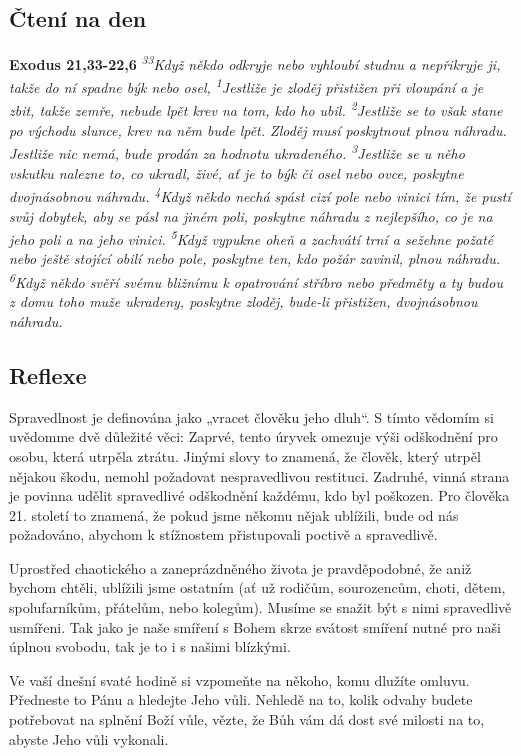 \documentclass[11pt]{article}
\begin{document}
\subsection*{Čtení na den}
\textbf{Exodus 21,33-22,6}
\newline
\textit{
\textsuperscript{33}Když někdo odkryje nebo vyhloubí studnu a nepřikryje ji, takže do ní spadne býk nebo osel,
\textsuperscript{1}Jestliže je zloděj přistižen při vloupání a je zbit, takže zemře, nebude lpět krev na tom, kdo ho ubil.
\textsuperscript{2}Jestliže se to však stane po východu slunce, krev na něm bude lpět. Zloděj musí poskytnout plnou náhradu. Jestliže nic nemá, bude prodán za hodnotu ukradeného.
\textsuperscript{3}Jestliže se u něho vskutku nalezne to, co ukradl, živé, ať je to býk či osel nebo ovce, poskytne dvojnásobnou náhradu.
\textsuperscript{4}Když někdo nechá spást cizí pole nebo vinici tím, že pustí svůj dobytek, aby se pásl na jiném poli, poskytne náhradu z nejlepšího, co je na jeho poli a na jeho vinici.
\textsuperscript{5}Když vypukne oheň a zachvátí trní a sežehne požaté nebo ještě stojící obilí nebo pole, poskytne ten, kdo požár zavinil, plnou náhradu.
\textsuperscript{6}Když někdo svěří svému bližnímu k opatrování stříbro nebo předměty a ty budou z domu toho muže ukradeny, poskytne zloděj, bude-li přistižen, dvojnásobnou náhradu.
}

\subsection*{Reflexe}
Spravedlnost je definována jako „vracet člověku jeho dluh“. S tímto vědomím si uvědomme dvě důležité věci: Zaprvé,
tento úryvek omezuje výši odškodnění pro osobu, která utrpěla ztrátu. Jinými slovy to znamená, že člověk, který utrpěl
nějakou škodu, nemohl požadovat nespravedlivou restituci. Zadruhé, vinná strana je povinna udělit spravedlivé
odškodnění každému, kdo byl poškozen. Pro člověka 21. století to znamená, že pokud jsme někomu nějak ublížili,
bude od nás požadováno, abychom k stížnostem přistupovali poctivě a spravedlivě.

Uprostřed chaotického a zaneprázdněného života je pravděpodobné, že aniž bychom chtěli, ublížili jsme ostatním (ať
už rodičům, sourozencům, choti, dětem, spolufarníkům, přátelům, nebo kolegům). Musíme se snažit být s nimi
spravedlivě usmířeni. Tak jako je naše smíření s Bohem skrze svátost smíření nutné pro naši úplnou svobodu, tak je to i
s našimi blízkými.

Ve vaší dnešní svaté hodině si vzpomeňte na někoho, komu dlužíte omluvu. Předneste to Pánu a hledejte Jeho vůli.
Nehledě na to, kolik odvahy budete potřebovat na splnění Boží vůle, vězte, že Bůh vám dá dost své milosti na to,
abyste Jeho vůli vykonali.
\end{document}
